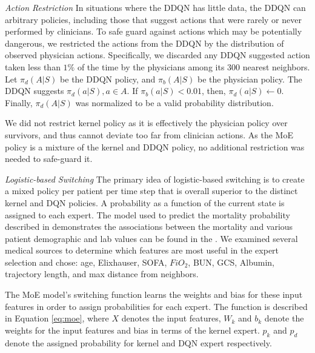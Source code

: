 \documentclass[10pt]{amia}
\begin{document}
\textit{Action Restriction}
In situations where the DDQN has little data, the DDQN can arbitrary policies, including those that suggest actions that were rarely or never performed by clinicians.  To safe guard against actions which may be potentially dangerous, we restricted the actions from the DDQN by the distribution of observed physician actions.  Specifically, we discarded any DDQN suggested action taken less than $1\%$ of the time by the physicians among its 300 nearest neighbors. Let $\pi_{d}(A|S)$ be the DDQN policy, and $\pi_{b}(A|S)$ be the physician policy. The DDQN suggests $\pi_{d}(a|S), a \in A$. If $\pi_{b}(a|S) < 0.01$, then, $\pi_{d}(a|S) \leftarrow 0$. Finally, $\pi_{d}(A|S)$ was normalized to be a valid probability distribution.

We did not restrict kernel policy as it is effectively the physician policy over survivors, and thus cannot deviate too far from clinician actions.  As the MoE policy is a mixture of the kernel and DDQN policy, no additional restriction was needed to safe-guard it.

\textit{Logistic-based Switching}
The primary idea of logistic-based switching is to create a mixed policy per patient per time step that is overall superior to the distinct kernel and DQN policies. A probability as a function of the current state is assigned to each expert. The model used to predict the mortality probability described in  demonstrates the associations between the mortality and various patient demographic and lab values can be found in the . %
We examined several medical sources \cite{jones2009sequential,beier2011elevation,tamion2010albumin} to determine which features are most useful in the expert selection and chose: age, Elixhauser, SOFA, $FiO_{2}$, BUN, GCS, Albumin, trajectory length, and max distance from neighbors. 

The MoE model's switching function learns the weights and bias for these input features in order to assign probabilities for each expert. The function is described in Equation \ref{eq:moe}, where $X$ denotes the input features, $W_{k}$ and $b_{k}$ denote the weights for the input features and bias in terms of the kernel expert. $p_{k}$ and $p_{d}$ denote the assigned probability for kernel and DQN expert respectively. 

\end{document}
